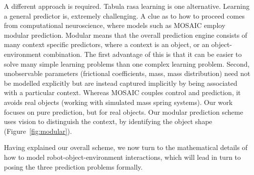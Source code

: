 A different approach is required. Tabula rasa learning is one alternative.  Learning a general predictor is, extremely challenging. A clue as to how to proceed comes from computational neuroscience, where models such as MOSAIC employ modular prediction. Modular means that the overall prediction engine consists of many context specific predictors, where a context is an object, or an object-environment combination. The first advantage of this is that it can be easier to solve many simple learning problems than one complex learning problem. Second, unobservable parameters (frictional coefficients, mass, mass distribution) need not be modelled explicitly but are instead captured implicitly by being associated with a particular context. Whereas MOSAIC couples control and prediction, it avoids real objects (working with simulated mass spring systems). Our work focuses on pure prediction, but for real objects. Our modular prediction scheme uses vision to distinguish the context, by identifying the object shape (Figure~\ref{fig:modular}).

Having explained our overall scheme, we now turn to the mathematical details of how to model robot-object-environment interactions, which will lead in turn to posing the three prediction problems formally.
